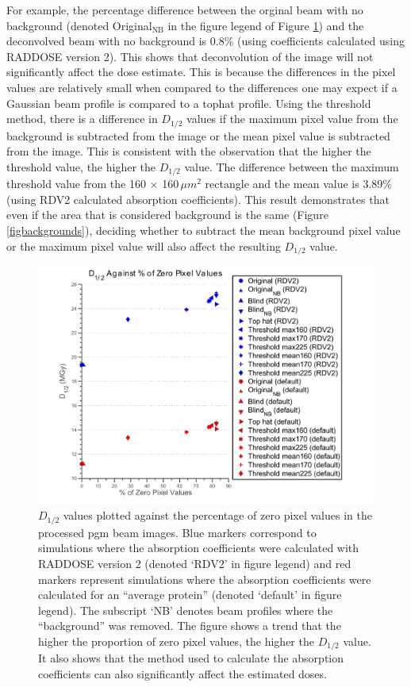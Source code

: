 For example, the percentage difference between the orginal beam with no background (denoted Original$_{\text{NB}}$ in the figure legend of Figure \ref{figdhalf}) and the deconvolved beam with no background is 0.8\% (using coefficients calculated using RADDOSE version 2).
This shows that deconvolution of the image will not significantly affect the dose estimate.
This is because the differences in the pixel values are relatively small when compared to the differences one may expect if a Gaussian beam profile is compared to a tophat profile.
\newline
Using the threshold method, there is a difference in $D_{1/2}$ values if the maximum pixel value from the background is subtracted from the image or the mean pixel value is subtracted from the image.
This is consistent with the observation that the higher the threshold value, the higher the $D_{1/2}$ value.
The difference between the maximum threshold value from the 160 $\times$ 160$\, \mu m^2$ rectangle and the mean value is $3.89\%$ (using RDV2 calculated absorption coefficients).
This result demonstrates that even if the area that is considered background is the same (Figure \ref{figbackgrounds}), deciding whether to subtract the mean background pixel value or the maximum pixel value will also affect the resulting $D_{1/2}$ value.

\begin{figure}
  \centering
    \includegraphics[width=1\textwidth]{figures/beam/d_half_plot.pdf}
    \caption{$D_{1/2}$ values plotted against the percentage of zero pixel values in the processed pgm beam images.
    Blue markers correspond to simulations where the absorption coefficients were calculated with RADDOSE version 2 (denoted `RDV2' in figure legend) and red markers represent simulations where the absorption coefficients were calculated for an ``average protein'' (denoted `default' in figure legend).
    The subscript `NB' denotes beam profiles where the ``background'' was removed.
    The figure shows a trend that the higher the proportion of zero pixel values, the higher the $D_{1/2}$ value.
    It also shows that the method used to calculate the absorption coefficients can also significantly affect the estimated doses.}
    \label{figdhalf}
\end{figure}
